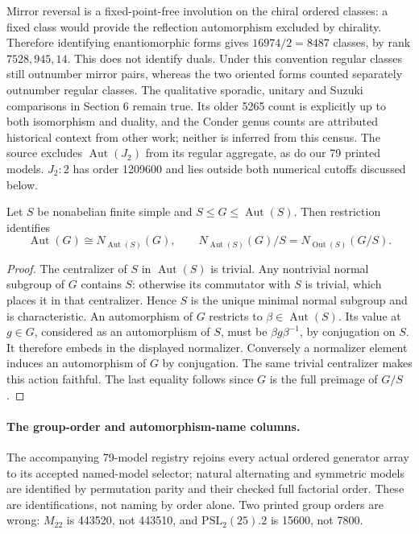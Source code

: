 \documentclass[10pt]{article}
\newcommand{\Aut}{\operatorname{Aut}}\newcommand{\Out}{\operatorname{Out}}
\begin{document}
Mirror reversal is a fixed-point-free involution on the chiral ordered
classes: a fixed class would provide the reflection automorphism excluded
by chirality. Therefore identifying enantiomorphic forms gives
$16974/2=8487$ classes, by rank $7528,945,14$. This does not identify
duals. Under this convention regular classes still outnumber mirror
pairs, whereas the two oriented forms counted separately outnumber
regular classes. The qualitative sporadic, unitary and Suzuki comparisons
in Section 6 remain true. Its older 5265 count is explicitly up to both
isomorphism and duality, and the Conder genus counts are attributed
historical context from other work; neither is inferred from this census.
The source excludes $\Aut(J_2)$ from its regular aggregate, as do our
79 printed models. $J_2:2$ has order 1209600 and lies outside both
numerical cutoffs discussed below.

\begin{lemma}
Let $S$ be nonabelian finite simple and $S\leq G\leq\Aut(S)$.
Then restriction identifies
\[
 \Aut(G)\cong N_{\Aut(S)}(G),\qquad
 N_{\Aut(S)}(G)/S=N_{\Out(S)}(G/S).
\]
\end{lemma}
\begin{proof}
The centralizer of $S$ in $\Aut(S)$ is trivial. Any nontrivial normal
subgroup of $G$ contains $S$: otherwise its commutator with $S$ is
trivial, which places it in that centralizer. Hence $S$ is the unique
minimal normal subgroup and is characteristic. An automorphism of $G$
restricts to $\beta\in\Aut(S)$. Its value at $g\in G$, considered as an
automorphism of $S$, must be $\beta g\beta^{-1}$, by conjugation on $S$.
It therefore embeds in the displayed normalizer. Conversely a normalizer
element induces an automorphism of $G$ by conjugation. The same trivial
centralizer makes this action faithful. The last equality follows since
$G$ is the full preimage of $G/S$.
\end{proof}

\paragraph{The group-order and automorphism-name columns.}
The accompanying 79-model registry rejoins every actual ordered
generator array to its accepted named-model selector; natural alternating
and symmetric models are identified by permutation parity and their
checked full factorial order. These are identifications, not naming by
order alone. Two printed group orders are wrong: $M_{22}$ is 443520,
not 443510, and $\mathrm{PSL}_2(25).2$ is 15600, not 7800.
\end{document}
